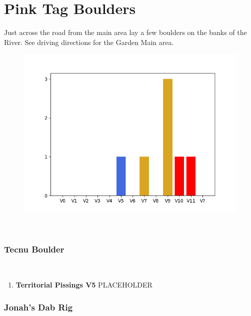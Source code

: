 \chapter{Pink Tag Boulders}\label{a:Pink Tag Boulders}
\lhead{\textcolor{\chapterColor}{\rule[-2pt]{\textwidth}{15pt}}}
Just across the road from the main area lay a few boulders on the banks of the River. See driving directions for the Garden Main area.
\begin{figure}[h]
  \centering
    \includegraphics[width=\linewidth]{./maps/plots/Pink Tag Boulders.png}
\end{figure}

\
\subsection*{Tecnu Boulder}\label{bf:Tecnu Boulder}
\

\begin{enumerate}[]
	\item\label{rt:Territorial Pissings} \colorbox{RoyalBlue!20}{\textbf{Territorial Pissings V5  } }
	\newline PLACEHOLDER\
\end{enumerate}
\subsection*{Jonah's Dab Rig}\label{bf:Jonah's Dab Rig}
\

